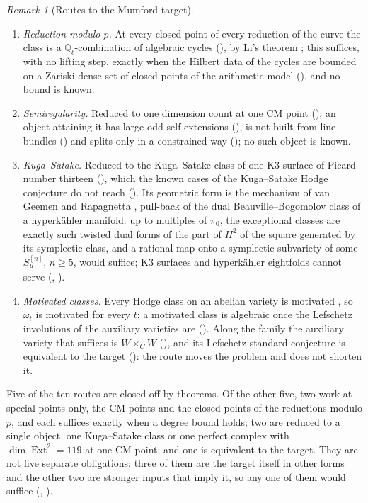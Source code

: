 \documentclass[11pt,reqno]{amsart}
\theoremstyle{plain}
\theoremstyle{definition}
\theoremstyle{remark}
\newtheorem{remark}[theorem]{Remark}
\newcommand{\QQ}{\mathbb{Q}}
\DeclareMathOperator{\Ext}{Ext}
\begin{document}
\begin{remark}[Routes to the Mumford target]
\begin{enumerate}[label=\textup{(\arabic*)},leftmargin=2.6em,itemsep=2pt]
  Rosati-fixed algebra $K_{c}^{+}$, all of it; the Weil structure of the
  fourfold, with which Markman's theorem produces its cycles, reaches $110$
  of the $132$ Hodge classes and none of the exceptional ones
  (, ).
\item \emph{Reduction modulo $p$.} At every closed point of every reduction
  of the curve the class is a $\QQ_{\ell}$-combination of algebraic cycles
  (), by Li's theorem \cite[Theorem~1.1]{Li26}; this
  suffices, with no lifting step, exactly when the Hilbert data of the cycles
  are bounded on a Zariski dense set of closed points of the arithmetic model
  (), and no bound is known.
\item \emph{Semiregularity.} Reduced to one dimension count at one CM point
  (); an object attaining it has large odd
  self-extensions (), is not built from line
  bundles () and splits only in a constrained way
  (); no such object is known.
\item \emph{Kuga--Satake.} Reduced to the Kuga--Satake class of one K3 surface
  of Picard number thirteen (), which the known cases of
  the Kuga--Satake Hodge conjecture do not reach (). Its
  geometric form is the mechanism of van Geemen and Rapagnetta \cite{vGR26},
  pull-back of the dual Beauville--Bogomolov class of a hyperk\"ahler
  manifold: up to multiples of $\pi_{0}$, the exceptional classes are exactly
  such twisted dual forms of the part of $H^{2}$ of the square generated by
  its symplectic class, and a rational map onto a
  symplectic subvariety of some $S_{\mu}^{[n]}$, $n\ge5$, would suffice;
  K3 surfaces and hyperk\"ahler eightfolds cannot serve
  (, ).
\item \emph{Motivated classes.} Every Hodge class on an abelian variety is
  motivated \cite[Th\'eor\`eme~0.6.2]{And96b}, so $\omega_{t}$ is motivated for
  every $t$; a motivated class is algebraic once the Lefschetz involutions of
  the auxiliary varieties are (). Along the family the
  auxiliary variety that suffices is $W\times_{C}W$
  (), and its Lefschetz standard conjecture is
  equivalent to the target (): the route moves the
  problem and does not shorten it.
\end{enumerate}
Five of the ten routes are closed off by theorems. Of the other five, two
work at special points only, the CM points and the closed points of the
reductions modulo $p$, and each suffices exactly when a degree bound holds;
two are reduced to a single object, one Kuga--Satake class or one perfect
complex with $\dim\Ext^{2}=119$ at one CM point; and one is equivalent to the
target. They are not five separate obligations: three of them are the target itself
in other forms and the other two are stronger inputs that imply it, so any
one of them would suffice (, ).
\end{remark}
\end{document}
